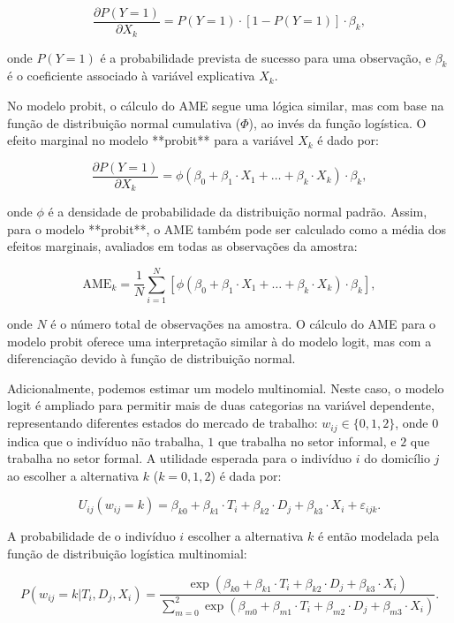 \documentclass[12pt, a4paper, openany]{book}
\numberwithin{equation}{chapter}
\numberwithin{table}{chapter}
\numberwithin{figure}{chapter}
\theoremstyle{break}
\begin{document}
\[
\frac{\partial P(Y = 1)}{\partial X_k} = P(Y = 1) \cdot \left[1 - P(Y = 1)\right] \cdot \beta_k,
\]

onde \(P(Y = 1)\) é a probabilidade prevista de sucesso para uma observação, e \(\beta_k\) é o coeficiente associado à variável explicativa \(X_k\).

No modelo probit, o cálculo do AME segue uma lógica similar, mas com base na função de distribuição normal cumulativa (\(\Phi\)), ao invés da função logística. O efeito marginal no modelo **probit** para a variável \(X_k\) é dado por:

\[
\frac{\partial P(Y = 1)}{\partial X_k} = \phi\left( \beta_0 + \beta_1 \cdot X_1 + \dots + \beta_k \cdot X_k \right) \cdot \beta_k,
\]

onde \(\phi\) é a densidade de probabilidade da distribuição normal padrão. Assim, para o modelo **probit**, o AME também pode ser calculado como a média dos efeitos marginais, avaliados em todas as observações da amostra:

\[
\text{AME}_k = \frac{1}{N} \sum_{i=1}^N \left[ \phi\left( \beta_0 + \beta_1 \cdot X_1 + \dots + \beta_k \cdot X_k \right) \cdot \beta_k \right],
\]

onde \(N\) é o número total de observações na amostra. O cálculo do AME para o modelo probit oferece uma interpretação similar à do modelo logit, mas com a diferenciação devido à função de distribuição normal.

Adicionalmente, podemos estimar um modelo multinomial. Neste caso, o modelo logit é ampliado para permitir mais de duas categorias na variável dependente, representando diferentes estados do mercado de trabalho: \(w_{ij} \in \{0, 1, 2\}\), onde \(0\) indica que o indivíduo não trabalha, \(1\) que trabalha no setor informal, e \(2\) que trabalha no setor formal. A utilidade esperada para o indivíduo \(i\) do domicílio \(j\) ao escolher a alternativa \(k\) (\(k = 0, 1, 2\)) é dada por:

\[
U_{ij}(w_{ij} = k) = \beta_{k0} + \beta_{k1} \cdot T_i + \beta_{k2} \cdot D_j + \beta_{k3} \cdot X_i + \varepsilon_{ijk}.
\]

A probabilidade de o indivíduo \(i\) escolher a alternativa \(k\) é então modelada pela função de distribuição logística multinomial:

\[
P(w_{ij} = k | T_i, D_j, X_i) = \frac{\exp\left( \beta_{k0} + \beta_{k1} \cdot T_i + \beta_{k2} \cdot D_j + \beta_{k3} \cdot X_i \right)}{\sum_{m=0}^2 \exp\left( \beta_{m0} + \beta_{m1} \cdot T_i + \beta_{m2} \cdot D_j + \beta_{m3} \cdot X_i \right)}.
\]
\end{document}
